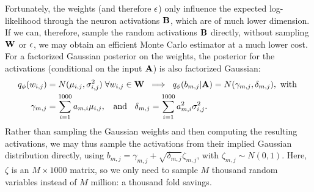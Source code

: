 Fortunately, the weights (and therefore $\mathbf{\epsilon}$) only influence the expected log-likelihood through the neuron activations $\mathbf{B}$, which are of much lower dimension. If we can, therefore, sample the random activations $\mathbf{B}$ directly, without sampling $\mathbf{W}$ or $\mathbf{\epsilon}$, we may obtain an efficient Monte Carlo estimator at a much lower cost. For a factorized Gaussian posterior on the weights, the posterior for the activations (conditional on the input $\mathbf{A}$) is also factorized Gaussian:
\begin{align}
q_\mathbf{\phi}(w_{i,j}) &= N(\mu_{i,j},\sigma^{2}_{i,j}) \hspace{0.1cm} \forall w_{i,j} \in \mathbf{W} \hspace{0.2cm} \Longrightarrow \hspace{0.2cm} q_\mathbf{\phi}(b_{m,j}|\mathbf{A}) = N(\gamma_{m,j},\delta_{m,j}), \text{ with } \nonumber\\
\gamma_{m,j} &= \sum_{i=1}^{1000} a_{m,i}\mu_{i,j}, \hspace{0.2cm} \text{ and } \hspace{0.2cm} \delta_{m,j} = \sum_{i=1}^{1000} a^{2}_{m,i}\sigma^{2}_{i,j}.
\end{align}
Rather than sampling the Gaussian weights and then computing the resulting activations, we may thus sample the activations from their implied Gaussian distribution directly, using $b_{m,j} = \gamma_{m,j} + \sqrt{\delta_{m,j}}\zeta_{m,j}$, with $\zeta_{m,j} \sim N(0,1)$. Here, $\zeta$ is an $M \times 1000$ matrix, so we only need to sample $M$ thousand random variables instead of $M$ million: a thousand fold savings.

